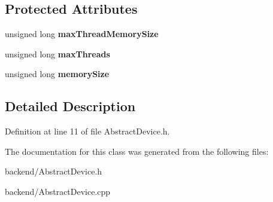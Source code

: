 \subsection*{Protected Attributes}
\begin{DoxyCompactItemize}
\item 
\mbox{\label{classathena_1_1backend_1_1_abstract_device_ac7851210f55e2f709b4ccbd23d9d3f76}} 
unsigned long {\bfseries max\+Thread\+Memory\+Size}
\item 
\mbox{\label{classathena_1_1backend_1_1_abstract_device_ade6690f678a25a634104dca162def5f9}} 
unsigned long {\bfseries max\+Threads}
\item 
\mbox{\label{classathena_1_1backend_1_1_abstract_device_af689d59af9dbf67df30275ab087b006a}} 
unsigned long {\bfseries memory\+Size}
\end{DoxyCompactItemize}


\subsection{Detailed Description}


Definition at line 11 of file Abstract\+Device.\+h.



The documentation for this class was generated from the following files\+:\begin{DoxyCompactItemize}
\item 
backend/Abstract\+Device.\+h\item 
backend/Abstract\+Device.\+cpp\end{DoxyCompactItemize}

